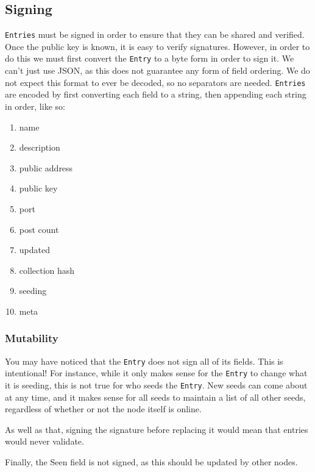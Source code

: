\newpage
\subsection{Signing}
\begin{multicols}{2}
	\texttt{Entries} must be signed in order to ensure that they can be shared and
	verified. Once the public key is known, it is easy to verify signatures.
	However, in order to do this we must first convert the \texttt{Entry} to a byte form
	in order to sign it. We can't just use JSON, as this does
	not guarantee any form of field ordering. We do not expect
	this format to ever be decoded, so no separators are needed. \texttt{Entries} 
	are encoded by first converting each field to a string, then appending each 
	string in order, like so:
\end{multicols}

	\begin{center}
	\begin{minipage}{0.5\linewidth}
	\begin{enumerate}
		\item name
		\item description
		\item public address
		\item public key
		\item port
		\item post count
		\item updated
		\item collection hash
		\item seeding \footnotemark
		\item meta
	\end{enumerate}
\end{minipage}
\end{center}

	\subsubsection{Mutability}
	\begin{multicols}{2}
	You may have noticed that the \texttt{Entry} does not sign all of its fields. This is
	intentional! For instance, while it only makes sense for the \texttt{Entry} to change
	what it is seeding, this is not true for who seeds the \texttt{Entry}. New seeds can
	come about at any time, and it makes sense for all seeds to maintain a list
	of all other seeds, regardless of whether or not the node itself is online.

	As well as that, signing the signature before replacing it would mean that
	entries would never validate.

	Finally, the Seen field is not signed, as this should be updated by other
	nodes. 
\end{multicols}
